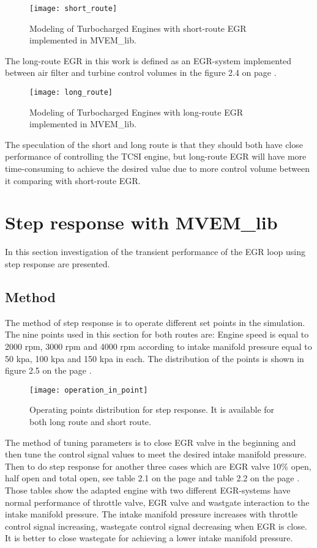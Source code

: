 \begin{figure}
\centering
\texttt{[image: short\_route]} 
\label{fig:short_route_model}
\caption{Modeling of Turbocharged Engines with short-route EGR implemented in MVEM\_lib.} 
\end{figure}

The long-route EGR in this work is defined as an EGR-system implemented between air filter and turbine control volumes in the figure 2.4 on page \pageref{long_route_model}.

\begin{figure}
\centering
\texttt{[image: long\_route]} 
\label{long_route_model}
\caption{Modeling of Turbocharged Engines with long-route EGR implemented in MVEM\_lib.} 
\end{figure}

The speculation of the short and long route is that they should both have close performance of controlling the TCSI engine, but long-route EGR will have more time-consuming to achieve the desired value due to more control volume between it comparing with short-route EGR. 

\section{Step response with MVEM\_lib}
In this section investigation of the transient performance of the EGR loop using step response are presented.

\subsection{Method}
The method of step response is to operate different set points in the simulation. The nine points used in this section for both routes are:
Engine speed is equal to 2000 rpm, 3000 rpm and 4000 rpm according to intake manifold pressure equal to 50 kpa, 100 kpa and 150 kpa in each. The distribution of the points is shown in figure 2.5 on the page \pageref{fig:operation_points}.

\begin{figure}
\centering
\texttt{[image: operation\_in\_point]} 
\label{fig:operation_points}
\caption{Operating points distribution for step response. It is available for both long route and short route.} 
\end{figure}

The method of tuning parameters is to close EGR valve in the beginning and then tune the control signal values to meet the desired intake manifold pressure. Then to do step response for another three cases which are EGR valve 10\% open, half open and total open, see table 2.1 on the page \pageref{fig:table_short_tune} and table 2.2 on the page \pageref{fig:table_long_tune}. Those tables show the adapted engine with two different EGR-systems have normal performance of throttle valve, EGR valve and wastgate interaction to the intake manifold pressure. The intake manifold pressure increases with throttle control signal increasing, wastegate control signal decreasing when EGR is close. It is better to close wastegate for achieving a lower intake manifold pressure.

